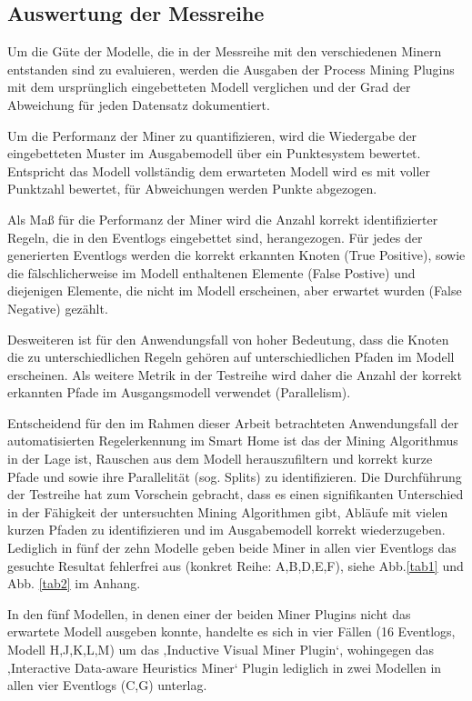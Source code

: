 \subsection{Auswertung der Messreihe}
Um die Güte der Modelle, die in der Messreihe mit den verschiedenen Minern entstanden sind zu evaluieren, werden die Ausgaben der Process Mining Plugins mit dem ursprünglich eingebetteten Modell verglichen und der Grad der Abweichung für jeden Datensatz dokumentiert.

Um die Performanz der Miner zu quantifizieren, wird  die Wiedergabe der eingebetteten Muster im Ausgabemodell über ein Punktesystem bewertet. Entspricht das Modell vollständig dem erwarteten Modell wird es mit voller Punktzahl bewertet, für Abweichungen werden Punkte abgezogen.

Als Maß für die Performanz der Miner wird die Anzahl korrekt identifizierter Regeln, die in den Eventlogs eingebettet sind, herangezogen. Für jedes der generierten Eventlogs werden die korrekt erkannten Knoten (True Positive), sowie die fälschlicherweise im Modell enthaltenen Elemente (False Postive) und diejenigen Elemente, die nicht im Modell erscheinen, aber erwartet wurden (False Negative) gezählt. 

Desweiteren ist für den Anwendungsfall von hoher Bedeutung, dass die Knoten die zu unterschiedlichen Regeln gehören auf unterschiedlichen Pfaden im Modell erscheinen. Als weitere Metrik in der Testreihe wird daher die Anzahl der korrekt erkannten Pfade im Ausgangsmodell verwendet (Parallelism). 

Entscheidend für den im Rahmen dieser Arbeit betrachteten Anwendungsfall der automatisierten Regelerkennung im Smart Home ist das der Mining Algorithmus in der Lage ist, Rauschen aus dem Modell herauszufiltern und korrekt kurze Pfade und sowie ihre Parallelität (sog. Splits) zu identifizieren. 
Die Durchführung der Testreihe hat zum Vorschein gebracht, dass es einen signifikanten Unterschied in der Fähigkeit der untersuchten Mining Algorithmen gibt, Abläufe mit vielen kurzen Pfaden zu identifizieren und im Ausgabemodell korrekt wiederzugeben. Lediglich in fünf der zehn Modelle geben beide Miner in allen vier Eventlogs das gesuchte Resultat fehlerfrei aus (konkret Reihe: A,B,D,E,F), siehe Abb.\ref{tab1} und Abb. \ref{tab2} im Anhang.

In den fünf Modellen, in denen einer der beiden Miner Plugins nicht das erwartete Modell ausgeben konnte, handelte es sich in vier Fällen (16 Eventlogs, Modell H,J,K,L,M) um das ‚Inductive Visual Miner Plugin‘, wohingegen das ‚Interactive Data-aware Heuristics Miner‘ Plugin lediglich in zwei Modellen in allen vier Eventlogs (C,G) unterlag.

